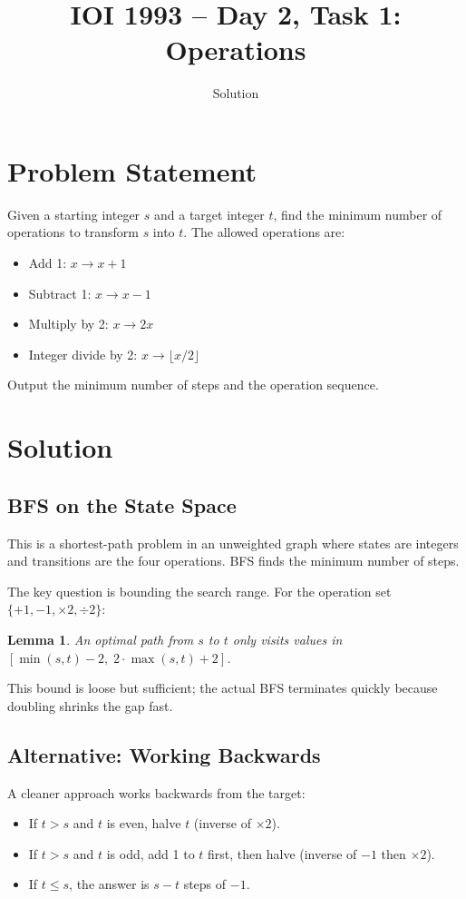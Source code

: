 \documentclass[11pt,a4paper]{article}
\title{IOI 1993 -- Day 2, Task 1: Operations}
\author{Solution}
\date{}
\newtheorem{lemma}[theorem]{Lemma}
\begin{document}
\maketitle

\section{Problem Statement}

Given a starting integer $s$ and a target integer $t$, find the minimum
number of operations to transform $s$ into $t$. The allowed operations are:
\begin{itemize}
  \item Add 1: $x \to x + 1$
  \item Subtract 1: $x \to x - 1$
  \item Multiply by 2: $x \to 2x$
  \item Integer divide by 2: $x \to \lfloor x/2 \rfloor$
\end{itemize}

Output the minimum number of steps and the operation sequence.

\section{Solution}

\subsection{BFS on the State Space}

This is a shortest-path problem in an unweighted graph where states are
integers and transitions are the four operations. BFS finds the minimum
number of steps.

The key question is bounding the search range. For the operation set
$\{+1, -1, \times 2, \div 2\}$:

\begin{lemma}
An optimal path from $s$ to $t$ only visits values in
$[\min(s,t) - 2,\; 2 \cdot \max(s,t) + 2]$.
\end{lemma}

This bound is loose but sufficient; the actual BFS terminates quickly because
doubling shrinks the gap fast.

\subsection{Alternative: Working Backwards}

A cleaner approach works backwards from the target:
\begin{itemize}
  \item If $t > s$ and $t$ is even, halve $t$ (inverse of $\times 2$).
  \item If $t > s$ and $t$ is odd, add 1 to $t$ first, then halve
    (inverse of $-1$ then $\times 2$).
  \item If $t \le s$, the answer is $s - t$ steps of $-1$.
\end{itemize}
\end{document}
